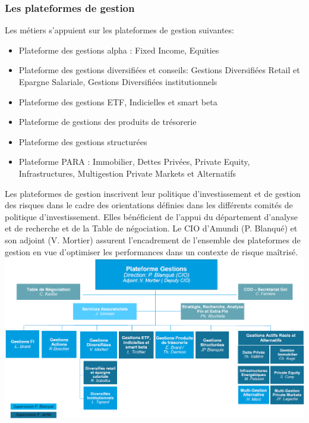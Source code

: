 \documentclass[12pt,a4paper]{report}
\begin{document}
\subsubsection{Les plateformes de gestion}
Les métiers s’appuient sur les plateformes de gestion suivantes:
\begin{itemize}
\item Plateforme des gestions alpha : Fixed Income, Equities
\item Plateforme des gestions diversifiées et conseils: Gestions Diversifiées Retail et Epargne Salariale, Gestions Diversifiées institutionnels
\item Plateforme des gestions ETF, Indicielles et smart beta
\item Plateforme de gestions des produits de trésorerie
\item Plateforme des gestions structurées
\item Plateforme PARA : Immobilier, Dettes Privées, Private Equity, Infrastructures, Multigestion Private Markets et Alternatifs
\end{itemize}
Les plateformes de gestion inscrivent leur politique d’investissement et de gestion des risques dans le cadre des orientations définies dans les différents comités de politique d’investissement.
Elles bénéficient de l’appui du département d’analyse et de recherche et de la Table de négociation.
Le CIO d’Amundi (P. Blanqué) et son adjoint (V. Mortier) assurent l’encadrement de l’ensemble des plateformes de gestion en vue d’optimiser les performances dans un contexte de risque maîtrisé.
\newline
\includegraphics[scale=0.7]{IMG/orga.png} \\[0.5cm]
\end{document}

